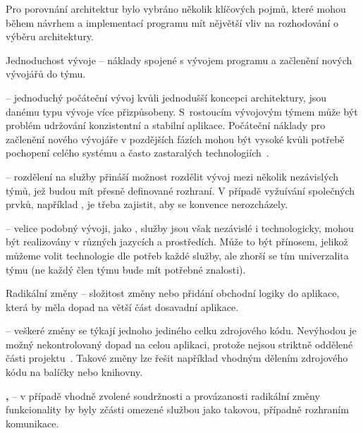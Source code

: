 Pro porovnání architektur bylo vybráno několik klíčových pojmů, které mohou během návrhem a implementací programu mít nějvětší vliv na rozhodování o výběru architektury.


\begin{dl}
   \item[Jednoduchost vývoje] – náklady spojené s vývojem programu a začlenění nových vývojářů do týmu.
\end{dl}
\begin{ul}
   \item \textbf{} – jednoduchý počáteční vývoj kvůli jednodušší koncepci architektury,  jsou danému typu vývoje více přizpůsobeny.
   S~rostoucím vývojovým týmem může být problém udržování konzistentní a stabilní aplikace.
   Počáteční náklady pro začlenění nového vývojáře v pozdějších fázích mohou být vysoké kvůli potřebě pochopení celého systému a často zastaralých technologiích~\cite{msachris}.
   \item \textbf{} – rozdělení na služby přináší možnost rozdělit vývoj mezi několik nezávislých týmů, jež budou mít přesně definované rozhraní.
   V případě vyžuívání společných prvků, například , je třeba zajistit, aby se konvence nerozcházely.
   \item \textbf{} – velice podobný vývoji, jako , služby jsou však nezávislé i technologicky, mohou být realizovány v různých jazycích a prostředích.
   Může to být přínosem, jelikož můžeme volit technologie dle potřeb každé služby, ale zhorší se tím univerzalita týmu (ne každý člen týmu bude mít potřebné znalosti).
\end{ul}

\begin{dl}
   \item[Radikální změny] – složitost změny nebo přidání obchodní logiky do aplikace, která by měla dopad na větší část dosavadní aplikace.
\end{dl}
\begin{ul}
   \item \textbf{} – veškeré změny se týkají jednoho jediného celku zdrojového kódu.
   Nevýhodou je možný nekontrolovaný dopad na celou aplikaci, protože nejsou striktně oddělené části projektu~\cite{msachris}.
   Takové změny lze řešit například vhodným dělením zdrojového kódu na balíčky nebo knihovny.
   \item \textbf{, } – v případě vhodně zvolené soudržnosti a provázanosti radikální změny funkcionality by byly zčásti omezené službou jako takovou, případně rozhraním komunikace.
\end{ul}

